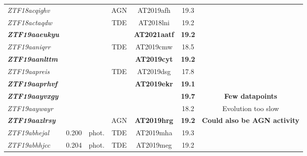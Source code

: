 \begin{table*}
\begin{tabular}{l  c  c  c   c  c  c}
    \textit{ZTF18acqighv}          & ~              & ~              & AGN                     & AT2019afh           & 19.3                       &                                     \\
    \textit{ZTF18actaqdw}          & ~              & ~              & TDE                     & AT2018lni           & 19.2                       &                                     \\
    \textbf{\textit{ZTF19aaeukyu}} & ~              & ~              & ~                       & \textbf{AT2021aatf} & \textbf{19.2}              &                                     \\
    \textit{ZTF19aaniqrr}          & ~              & ~              & TDE                     & AT2019cmw           & 18.5                       &                                     \\
    \textbf{\textit{ZTF19aanlttm}} & ~              & ~              & ~                       & \textbf{AT2019cyt}  & \textbf{19.2}              &                                     \\
    \textit{ZTF19aapreis}          & ~              & ~              & TDE                     & AT2019dsg           & 17.8                       &                                     \\
    \textbf{\textit{ZTF19aaprhvf}} & ~              & ~              & ~                       & \textbf{AT2019ekr}  & \textbf{19.1}              &                                     \\
    \textbf{\textit{ZTF19aayvxgy}} & ~              & ~              & ~                       & ~                   & \textbf{19.7}              & \textbf{Few datapoints}             \\
    \textit{ZTF19aaywayr}          & ~              & ~              & ~                       & ~                   & 18.2                       & Evolution too slow                  \\
    \textbf{\textit{ZTF19aazlrsy}} & ~              & ~              & AGN                     & \textbf{AT2019hrg}  & \textbf{ 19.2}             & \textbf{Could also be AGN activity} \\
    \textit{ZTF19abhejal}          & 0.200          & phot.          & TDE                     & AT2019mha           & 19.3                       &                                     \\
    \textit{ZTF19abhhjcc}          & 0.204          & phot.          & TDE                     & AT2019meg           & 19.2                       &                                     \\

\end{tabular}
\end{table*}
